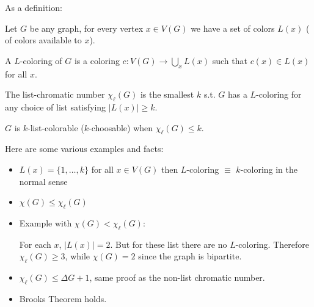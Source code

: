 As a definition:
\begin{definition}
Let $G$ be any graph, for every vertex $x\in V(G)$ we have a set of colors $L(x)$ ( of colors available to $x$).

A $L$-coloring of $G$ is a coloring $c:V(G)\rightarrow \underset{x}{\bigcup} L(x)$ such that $c(x)\in L(x)$ for all $x$. 

The list-chromatic number $\chi_{\ell}(G)$ is the smallest $k$ s.t. $G$ has a $L$-coloring for any choice of list satisfying $|L(x)|\geq k$. 

$G$ is $k$-list-colorable ($k$-choosable) when $\chi_{\ell}(G)\leq k$.
\end{definition}

\begin{example}
Here are some various examples and facts:

\begin{itemize}
\item $L(x)=\{1,\ldots,k\}$ for all $x\in V(G)$ then $L$-coloring $\equiv$ $k$-coloring in the normal sense
\item $\chi(G)\leq \chi_{\ell}(G)$
\item Example with $\chi(G) < \chi_{\ell}(G)$:
\begin{center}
\end{center}
For each $x$, $|L(x)|=2$. But for these list there are no $L$-coloring. Therefore $\chi_{\ell}(G)\geq 3$, while $\chi(G)=2$ since the graph is bipartite.
\item $\chi_{\ell}(G)\leq \Delta G+1$, same proof as the non-list chromatic number.
\item Brooks Theorem holds.
\end{itemize}
\end{example}

